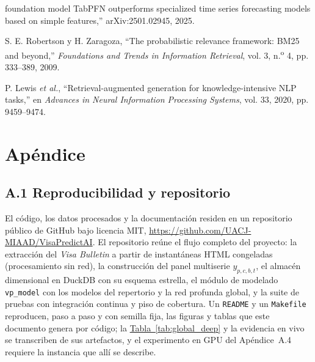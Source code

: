 \documentclass[12pt,letterpaper]{report}
\begin{document}
{\begin{enumerate}[label={[\arabic*]}, leftmargin=*, itemsep=0pt, parsep=0pt, topsep=0pt]
foundation model TabPFN outperforms specialized time series forecasting models based on
simple features,''
arXiv:2501.02945, 2025.
\item\label{bib:66} S. E. Robertson y H. Zaragoza, ``The probabilistic relevance framework: BM25
and beyond,'' \textit{Foundations and Trends in Information Retrieval}, vol. 3,
n.\textsuperscript{o} 4, pp. 333--389, 2009.
\item\label{bib:67} P. Lewis \textit{et al.}, ``Retrieval-augmented generation for
knowledge-intensive NLP tasks,'' en \textit{Advances in Neural Information Processing Systems},
vol. 33, 2020, pp. 9459--9474.
\end{enumerate}
\par}

\appendix
\chapter{Apéndice}

\section{A.1 Reproducibilidad y repositorio}

El código, los datos procesados y la documentación residen en un repositorio público de GitHub
bajo licencia MIT, \url{https://github.com/UACJ-MIAAD/VisaPredictAI}. El repositorio reúne el
flujo completo del proyecto: la extracción del \textit{Visa Bulletin} a partir de instantáneas
HTML congeladas (procesamiento sin red), la construcción del panel multiserie $y_{p,c,b,t}$, el
almacén dimensional en DuckDB con su esquema estrella, el módulo de modelado \texttt{vp\_model}
con los \factNModels{} modelos del repertorio y la red profunda global, y la suite de pruebas con
integración continua y piso de cobertura. Un \texttt{README} y un \texttt{Makefile}
reproducen, paso a paso y con semilla fija, las figuras y tablas que este documento genera por
código; la \hyperref[tab:global_deep]{Tabla~\ref*{tab:global_deep}} y la evidencia en vivo se transcriben de sus artefactos, y
el experimento en GPU del Apéndice~A.4 requiere la instancia que allí se describe.
\end{document}
